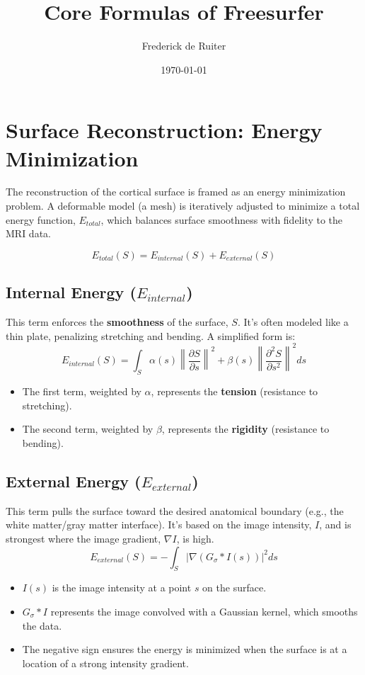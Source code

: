\documentclass[12pt]{article}
\title{Core Formulas of Freesurfer}
\author{Frederick de Ruiter}
\date{\today}
\begin{document}
\maketitle

\tableofcontents

\section{Surface Reconstruction: Energy Minimization}

The reconstruction of the cortical surface is framed as an energy minimization problem. A deformable model (a mesh) is iteratively adjusted to minimize a total energy function, $E_{total}$, which balances surface smoothness with fidelity to the MRI data.

\begin{equation}
E_{total}(S) = E_{internal}(S) + E_{external}(S)
\end{equation}

\subsection{Internal Energy ($E_{internal}$)}
This term enforces the \textbf{smoothness} of the surface, $S$. It's often modeled like a thin plate, penalizing stretching and bending. A simplified form is:
\begin{equation}
E_{internal}(S) = \int_{S} \alpha(s) \left\| \frac{\partial S}{\partial s} \right\|^2 + \beta(s) \left\| \frac{\partial^2 S}{\partial s^2} \right\|^2 ds
\end{equation}
\begin{itemize}
    \item The first term, weighted by $\alpha$, represents the \textbf{tension} (resistance to stretching).
    \item The second term, weighted by $\beta$, represents the \textbf{rigidity} (resistance to bending).
\end{itemize}

\subsection{External Energy ($E_{external}$)}
This term pulls the surface toward the desired anatomical boundary (e.g., the white matter/gray matter interface). It's based on the image intensity, $I$, and is strongest where the image gradient, $\nabla I$, is high.
\begin{equation}
E_{external}(S) = - \int_{S} \left| \nabla (G_{\sigma} * I(s)) \right|^2 ds
\end{equation}
\begin{itemize}
    \item $I(s)$ is the image intensity at a point $s$ on the surface.
    \item $G_{\sigma} * I$ represents the image convolved with a Gaussian kernel, which smooths the data.
    \item The negative sign ensures the energy is minimized when the surface is at a location of a strong intensity gradient.
\end{itemize}
\end{document}
